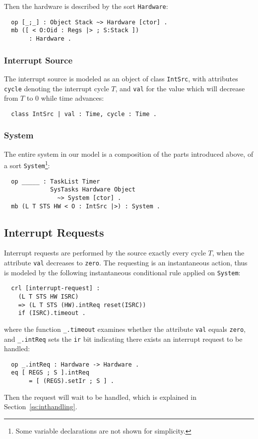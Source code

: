 \documentclass[10pt,journal]{IEEEtran}
\begin{document}
Then the hardware is described by the sort \verb|Hardware|:
\begin{verbatim}
  op [_;_] : Object Stack ~> Hardware [ctor] .
  mb ([ < O:Oid : Regs |> ; S:Stack ]) 
       : Hardware .
\end{verbatim}

\subsubsection{Interrupt Source}
The interrupt source is modeled as an object of class \verb|IntSrc|,
with attributes \verb|cycle| denoting the interrupt cycle $T$, and
\verb|val| for the value which will decrease from $T$ to $0$ while
time advances:
\begin{verbatim}
  class IntSrc | val : Time, cycle : Time .
\end{verbatim}

\subsubsection{System}
The entire system in our model is a composition of the parts
introduced above, of a sort \verb|System|\footnote{Some variable
  declarations are not shown for simplicity.}:
\begin{verbatim}
  op _____ : TaskList Timer 
             SysTasks Hardware Object 
               ~> System [ctor] .
  mb (L T STS HW < O : IntSrc |>) : System .
\end{verbatim}

\subsection{Interrupt Requests}
\label{ss:ir}
Interrupt requests are performed by the source exactly every cycle
$T$, when the attribute \verb|val| decreases to \verb|zero|. The
requesting is an instantaneous action, thus is modeled by the
following instantaneous conditional rule applied on \verb|System|:
\begin{verbatim}
  crl [interrupt-request] :
    (L T STS HW ISRC) 
    => (L T STS (HW).intReq reset(ISRC))
    if (ISRC).timeout .
\end{verbatim}
where the function \verb|_.timeout| examines whether the attribute
\verb|val| equals \verb|zero|, and \verb|_.intReq| sets the \verb|ir|
bit indicating there exists an interrupt request to be handled:
\begin{verbatim}
  op _.intReq : Hardware -> Hardware .
  eq [ REGS ; S ].intReq 
       = [ (REGS).setIr ; S ] .
\end{verbatim}
Then the request will wait to be handled, which is explained in
Section~\ref{ss:inthandling}.
\end{document}
